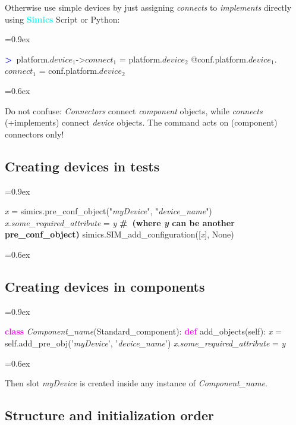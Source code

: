 \documentclass[8pt]{extarticle}
\newcommand{\mywarning}{{\huge \warning}}
\newenvironment{code}[1][]{%
\begin{prebox}[#1]\obeylines%
\fontdimen2\font=0.9ex%
}{%
\end{prebox}%
\fontdimen2\font=0.6ex%
}
\newcommand{\cod}[2][green!10]{\tcbox[
    size=fbox,
    on line,
    colback=#1,
    colframe=black,
    arc=0.3em  %
]{#2}}
\newcommand{\ind}{\hphantom{~~~}}
\newcommand{\sprompt}{\textcolor{blue}{\textbf{>}\ }}
\newcommand{\kw}[1]{\textcolor{magenta}{\textbf{#1}}}
\newcommand{\cmtcommon}[1]{\textcolor{Sepia}{\textbf{#1}}}
\newcommand{\cmt}[1]{\cmtcommon{\#\ #1}}
\newcommand{\p}[1]{\textit{\large#1}}
\newcommand{\Simics}{\textcolor{cyan}{\textbf{Simics}}}
\begin{document}
\begin{multicols*}{3}
Otherwise use simple devices by just assigning \textit{connects} to
\textit{implements} directly using \Simics{} Script or Python:
\begin{code}
    \sprompt platform.$device_1$->$connect_1$ = platform.$device_2$
    @conf.platform.$device_1$.$connect_1$ = conf.platform.$device_2$
\end{code}

\mywarning Do not confuse: \textit{Connectors} connect \textit{component}
objects, while \textit{connects} (+implements) connect \textit{device}
objects. The \cod{connect} command acts on (component) connectors only!

\subsection{Creating devices in tests}

\begin{code}
    \p{x} = simics.pre_conf_object("\p{myDevice}", "\p{device_name}")
    \p{x.some_required_attribute} = \p{y}
    \ind\cmt{(where \p{y} can be another pre_conf_object)}
    simics.SIM_add_configuration([\p{x}], None)
\end{code}

\subsection{Creating devices in components}

\begin{code}
    \kw{class} \p{Component_name}(Standard_component):
    \ind \kw{def} add_objects(self):
    \ind\ind \p{x} = self.add_pre_obj('\p{myDevice}', '\p{device_name}')
    \ind\ind \p{x.some_required_attribute} = \p{y}
\end{code}

Then slot \p{myDevice} is created inside any instance of \p{Component_name}.

\subsection{Structure and initialization order}


\end{multicols*}
\end{document}
